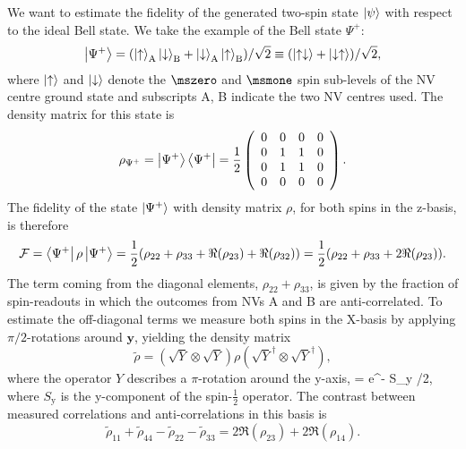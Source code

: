 We want to estimate the fidelity of the generated two-spin state $\left|\psi\right>$ with respect to the ideal Bell state. We take the example of the Bell state $\Psi^+$:
\begin{equation}
\left|\Psi^+\right> = (\left|\uparrow\right>_\mathrm{A}\left|\downarrow\right>_\mathrm{B} + \left|\downarrow\right>_\mathrm{A}\left|\uparrow\right>_\mathrm{B})/\sqrt{2} \equiv (\left|\uparrow\downarrow\right>+\left|\downarrow\uparrow\right>)/\sqrt{2} ,
\end{equation}
where $\left|\uparrow\right>$ and $\left|\downarrow\right>$ denote the $\mszero$ and $\msmone$ spin sub-levels of the NV centre ground state and subscripts A, B indicate the two NV centres used. The density matrix for this state is
\begin{equation}
\rho_{\Psi^+} = \left|\Psi^+\right>\left<\Psi^+\right| = \frac{1}{2}\left(
\begin{array}{cccc}
 0 & 0 & 0 & 0 \\
 0 & 1 & 1 & 0 \\
 0 & 1 & 1 & 0 \\
 0 & 0 & 0 & 0
\end{array}
\right).
\end{equation}
The fidelity of the state $\left|\Psi^+\right>$ with density matrix $\rho$, for both spins in the z-basis, is therefore
\begin{equation}
\mathcal{F} = \left<\Psi^+\right|\rho\left|\Psi^+\right> = \frac{1}{2}(\rho_{22}+\rho_{33}+\Re(\rho_{23})+\Re(\rho_{32})) = \frac{1}{2}(\rho_{22}+\rho_{33}+ 2\Re(\rho_{23})).
\end{equation}
The term coming from the diagonal elements, $\rho_{22} + \rho_{33}$, is given by the fraction of spin-readouts in which the outcomes from NVs A and B are anti-correlated. To estimate the off-diagonal terms we measure both spins in the X-basis by applying $\pi/2$-rotations around $\mathbf y$, yielding the density matrix
\begin{equation}
\tilde{\rho} = \left ( \sqrt{Y}\otimes\sqrt{Y} \right ) \rho \left ( \sqrt{Y}^{\dagger}\otimes\sqrt{Y}^{\dagger} \right ),
\end{equation}
where the operator $Y$ describes a $\pi$-rotation around the y-axis, 
\be
{} = \mathrm e^{- S_\mathrm y \pi/2},
\ee
where $S_\mathrm y$ is the y-component of the spin-$\frac{1}{2}$ operator. The contrast between measured correlations and anti-correlations in this basis is
\begin{equation}
\tilde{\rho}_{11}+\tilde{\rho}_{44}-\tilde{\rho}_{22}-\tilde{\rho}_{33} = 2\Re(\rho_{23})+2\Re(\rho_{14}).
\end{equation}
